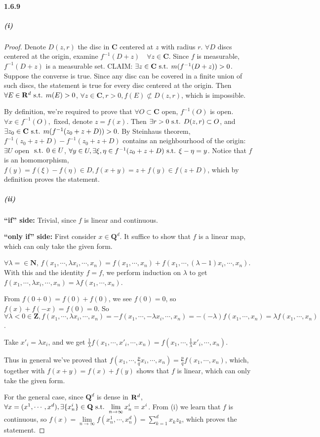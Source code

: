 \documentclass{article}
\begin{document}
\paragraph{1.6.9}
\subparagraph{(i)}
\begin{proof}
Denote $D(z,r)$ the disc in $\mathbf{C}$ centered at $z$ with radius $r$. $\forall D$ discs centered at the origin, examine $f^{-1}(D+z)\quad \forall z\in \mathbf{C}$. Since $f$ is measurable, $f^{-1}(D+z)$ is a measurable set. CLAIM: $\exists z\in \mathbf{C}\text{ s.t. } m(f^{-1}(D+z))>0$. Suppose the converse is true. Since any disc can be covered in a finite union of such discs, the statement is true for every disc centered at the origin. Then $\forall E\in\mathbf{R}^d\text{ s.t. } m(E)>0$, $\forall z\in \mathbf{C}, r>0, f(E)\not\subset D(z,r)$, which is impossible.

By definition, we're required to prove that $\forall O\subset \mathbf{C}$ open, $f^{-1}(O)$ is open. $\forall x\in f^{-1}(O),\text{ fixed, denote } z=f(x)$. Then $\exists r>0\text{ s.t. } D(z,r)\subset O$, and $\exists z_0\in\mathbf{C}\text{ s.t. } m(f^{-1}(z_0+z+D))>0$. By Steinhaus theorem, $f^{-1}(z_0+z+D)-f^{-1}(z_0+z+D)$ contains an neighbourhood of the origin: $\exists U$ open $\text{ s.t. } 0\in U$, $\forall y\in U, \exists \xi,\eta\in f^{-1}(z_0+z+D)\text{ s.t. } \xi-\eta=y$. Notice that $f$ is an homomorphism, $f(y)=f(\xi)-f(\eta)\in D, f(x+y)=z+f(y)\in f(z+D)$, which by definition proves the statement.
\subparagraph{(ii)}
\textbf{``if'' side:} Trivial, since $f$ is linear and continuous.

\textbf{``only if'' side:} First consider $x\in\mathbf{Q}^d$. It suffice to show that $f$ is a linear map, which can only take the given form. 

$\forall \lambda=\in \mathbf{N}$, $f(x_1,\cdots,\lambda x_i,\cdots,x_n)=f(x_1,\cdots,x_n)+f(x_1,\cdots, (\lambda-1)x_i,\cdots, x_n)$. With this and the identity $f=f$, we perform induction on $\lambda$ to get $f(x_1,\cdots,\lambda x_i,\cdots,x_n)=\lambda f(x_1,\cdots,x_n)$.

From $f(0+0)=f(0)+f(0)$, we see $f(0)=0$, so $f(x)+f(-x)=f(0)=0$. So $\forall\lambda<0\in\mathbf{Z}, f(x_1,\cdots,\lambda x_i,\cdots,x_n)=-f(x_1,\cdots,-\lambda x_i,\cdots,x_n)=-(-\lambda)f(x_1,\cdots,x_n)=\lambda f(x_1,\cdots,x_n)$. 

Take $x'_i=\lambda x_i$, and we get $\frac 1 \lambda f(x_1,\cdots, x'_i,\cdots,x_n)=f(x_1,\cdots, \frac 1 \lambda x'_i,\cdots, x_n)$. 

Thus in general we've proved that $f(x_1,\cdots, \frac p q x_i,\cdots, x_n)=\frac p q f(x_1,\cdots, x_n)$, which, together with $f(x+y)=f(x)+f(y)$ shows that $f$ is linear, which can only take the given form.

For the general case, since $\mathbf{Q}^d$ is dense in $\mathbf{R}^d$, $\forall x=(x^1,\cdots,x^d),\exists \{x_n^i\}\in\mathbf{Q}\text{ s.t. } \lim\limits_{n\to\infty}x^i_n=x^i$. From (i) we learn that $f$ is continuous, so $f(x)=\lim\limits_{n\to\infty}f(x^1_n,\cdots, x^d_n)=\sum\limits_{k=1}^d x_kz_k$, which proves the statement.
\end{proof}
\end{document}
